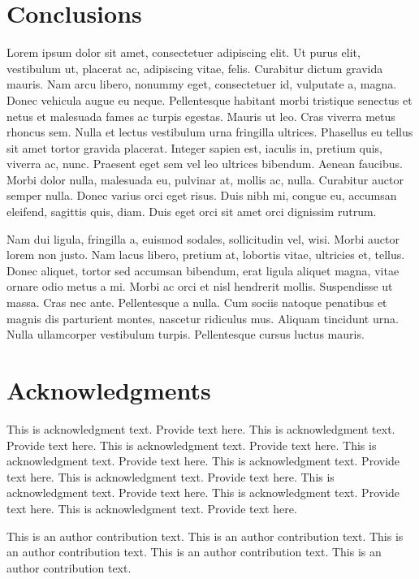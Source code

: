 \documentclass[CJCE,STIX2COL]{WileyNJD-v2}
\begin{document}
\section{Conclusions}\label{sec5}

Lorem ipsum dolor sit amet, consectetuer adipiscing elit. Ut purus elit, vestibulum ut, placerat ac, adipiscing vitae,
felis. Curabitur dictum gravida mauris. Nam arcu libero, nonummy eget, consectetuer id, vulputate a, magna. Donec
vehicula augue eu neque. Pellentesque habitant morbi tristique senectus et netus et malesuada fames ac turpis egestas.
Mauris ut leo. Cras viverra metus rhoncus sem. Nulla et lectus vestibulum urna fringilla ultrices. Phasellus eu tellus
sit amet tortor gravida placerat. Integer sapien est, iaculis in, pretium quis, viverra ac, nunc. Praesent eget sem vel
leo ultrices bibendum. Aenean faucibus. Morbi dolor nulla, malesuada eu, pulvinar at, mollis ac, nulla. Curabitur
auctor semper nulla. Donec varius orci eget risus. Duis nibh mi, congue eu, accumsan eleifend, sagittis quis, diam.
Duis eget orci sit amet orci dignissim rutrum.

Nam dui ligula, fringilla a, euismod sodales, sollicitudin vel, wisi. Morbi auctor lorem non justo. Nam lacus libero,
pretium at, lobortis vitae, ultricies et, tellus. Donec aliquet, tortor sed accumsan bibendum, erat ligula aliquet magna,
vitae ornare odio metus a mi. Morbi ac orci et nisl hendrerit mollis. Suspendisse ut massa. Cras nec ante. Pellentesque
a nulla. Cum sociis natoque penatibus et magnis dis parturient montes, nascetur ridiculus mus. Aliquam tincidunt
urna. Nulla ullamcorper vestibulum turpis. Pellentesque cursus luctus mauris.


\section*{Acknowledgments}

This is acknowledgment text. Provide text here. This is acknowledgment text. Provide text here. This is acknowledgment text. Provide text here. This is acknowledgment text. Provide text here. This is acknowledgment text. Provide text here. This is acknowledgment text. Provide text here. This is acknowledgment text. Provide text here. This is acknowledgment text. Provide text here. This is acknowledgment text. Provide text here. 


This is an author contribution text. This is an author contribution text. This is an author contribution text. This is an author contribution text. This is an author contribution text. 
\end{document}

